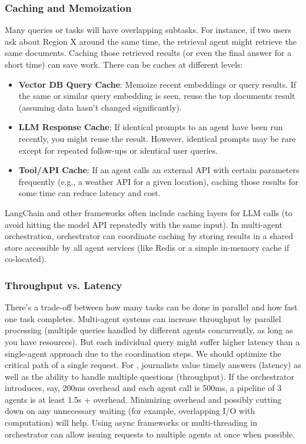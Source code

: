 \subsubsection*{Caching and Memoization}
Many queries or tasks will have overlapping subtasks. For instance, if two users ask about Region X around the same time, the retrieval agent might retrieve the same documents. Caching those retrieved results (or even the final answer for a short time) can save work. There can be caches at different levels:
\begin{itemize}
    \item \textbf{Vector DB Query Cache}: Memoize recent embeddings or query results. If the same or similar query embedding is seen, reuse the top documents result (assuming data hasn’t changed significantly).
    \item \textbf{LLM Response Cache}: If identical prompts to an agent have been run recently, you might reuse the result. However, identical prompts may be rare except for repeated follow-ups or identical user queries.
    \item \textbf{Tool/API Cache}: If an agent calls an external API with certain parameters frequently (e.g., a weather API for a given location), caching those results for some time can reduce latency and cost.
\end{itemize}
LangChain \cite{blogLangChain} and other frameworks often include caching layers for LLM calls (to avoid hitting the model API repeatedly with the same input). In multi-agent orchestration, orchestrator can coordinate caching by storing results in a shared store accessible by all agent services (like Redis or a simple in-memory cache if co-located).

\subsubsection*{Throughput vs. Latency}
There’s a trade-off between how many tasks can be done in parallel and how fast one task completes. Multi-agent systems can increase throughput by parallel processing (multiple queries handled by different agents concurrently, as long as you have resources). But each individual query might suffer higher latency than a single-agent approach due to the coordination steps. We should optimize the critical path of a single request. For \ishtar{}, journalists value timely answers (latency) as well as the ability to handle multiple questions (throughput). If the orchestrator introduces, say, 200ms overhead and each agent call is 500ms, a pipeline of 3 agents is at least 1.5s + overhead. Minimizing overhead and possibly cutting down on any unnecessary waiting (for example, overlapping I/O with computation) will help. Using async frameworks or multi-threading in orchestrator can allow issuing requests to multiple agents at once when possible.

